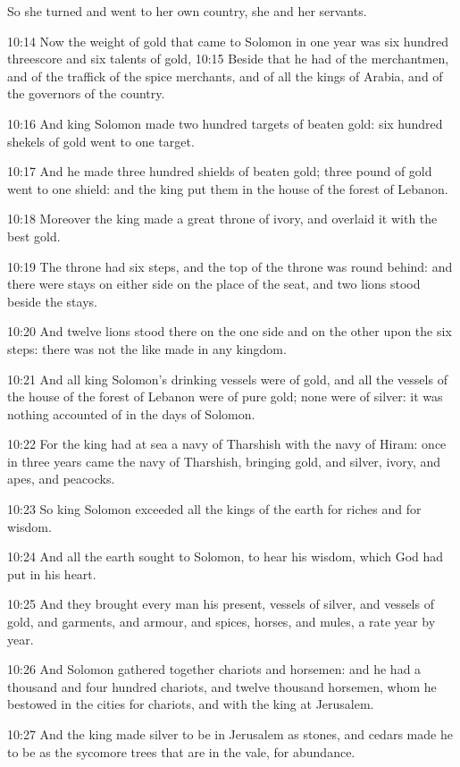 So she turned and went to her own country, she and her servants.

10:14 Now the weight of gold that came to Solomon in one year was six
hundred threescore and six talents of gold, 10:15 Beside that he had
of the merchantmen, and of the traffick of the spice merchants, and of
all the kings of Arabia, and of the governors of the country.

10:16 And king Solomon made two hundred targets of beaten gold: six
hundred shekels of gold went to one target.

10:17 And he made three hundred shields of beaten gold; three pound of
gold went to one shield: and the king put them in the house of the
forest of Lebanon.

10:18 Moreover the king made a great throne of ivory, and overlaid it
with the best gold.

10:19 The throne had six steps, and the top of the throne was round
behind: and there were stays on either side on the place of the seat,
and two lions stood beside the stays.

10:20 And twelve lions stood there on the one side and on the other
upon the six steps: there was not the like made in any kingdom.

10:21 And all king Solomon's drinking vessels were of gold, and all
the vessels of the house of the forest of Lebanon were of pure gold;
none were of silver: it was nothing accounted of in the days of
Solomon.

10:22 For the king had at sea a navy of Tharshish with the navy of
Hiram: once in three years came the navy of Tharshish, bringing gold,
and silver, ivory, and apes, and peacocks.

10:23 So king Solomon exceeded all the kings of the earth for riches
and for wisdom.

10:24 And all the earth sought to Solomon, to hear his wisdom, which
God had put in his heart.

10:25 And they brought every man his present, vessels of silver, and
vessels of gold, and garments, and armour, and spices, horses, and
mules, a rate year by year.

10:26 And Solomon gathered together chariots and horsemen: and he had
a thousand and four hundred chariots, and twelve thousand horsemen,
whom he bestowed in the cities for chariots, and with the king at
Jerusalem.

10:27 And the king made silver to be in Jerusalem as stones, and
cedars made he to be as the sycomore trees that are in the vale, for
abundance.

